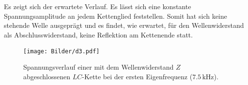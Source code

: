 Es zeigt sich der erwartete Verlauf. Es lässt sich eine konstante Spannungsamplitude an jedem Kettenglied feststellen.
Somit hat sich keine stehende Welle ausgeprägt und es findet, wie erwartet, für den Wellenwiderstand als Abschlusswiderstand, keine Reflektion am Kettenende statt.


\begin{figure}
	\centering
	\texttt{[image: Bilder/d3.pdf]}
	\caption{Spannungsverlauf einer mit dem Wellenwiderstand $Z$ abgeschlossenen $LC$-Kette bei der ersten Eigenfrequenz ($7.5 \,\si{\kilo\Hz}$).}
	\label{fig:really?!}
\end{figure}
